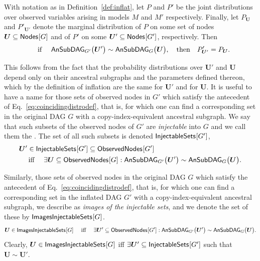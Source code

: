 With notation as in Definition~\ref{def:inflat}, let $P$ and $P'$ be the joint distributions over observed variables arising in models $M$ and $M'$ respectively.  Finally, let $P_{\bm{U}}$ and $P'_{\bm{U}'}$ denote the marginal distribution of $P$ on some set of nodes $\bm{U}\subseteq\nodes{G}$ and of $P'$ on some $\bm{U}'\subseteq\nodes{G'}$, respectively. Then
\begin{align}\label{eq:coincidingdistrodef}
\quad\text{if }\quad \ansubgraph[G']{\bm{U}'}\sim\ansubgraph[G]{\bm{U}}, \quad\text{then}\quad P'_{\bm{U}'}=P_{\bm{U}}.
\end{align}

This follows from the fact that the probability distributions over $\bm{U}'$ and $\bm{U}$ depend only on their ancestral subgraphs and the parameters defined thereon, which by the definition of inflation are the same for $\bm{U}'$ and for $\bm{U}$.
It is useful to have a name for those sets of observed nodes in $G'$ which satisfy the antecedent of Eq.~\eqref{eq:coincidingdistrodef}, that is, for which one can find a corresponding set in the original DAG $G$ with a copy-index-equivalent ancestral subgraph.  We say that such subsets of the observed nodes of $G'$ are {\em injectable} into $G$ and we call them the .  The set of all such subsets is denoted $\SmallNamedFunction{InjectableSets}{G'}$,
\begin{align}\begin{split}\label{eq:definjectable}
&\bm{U}'\in\SmallNamedFunction{InjectableSets}{G'} \subseteq \SmallNamedFunction{ObservedNodes}{G'} \\
&\quad\text{ iff }\quad \exists \bm{U}\subseteq \SmallNamedFunction{ObservedNodes}{G}: \ansubgraph[G']{\bm{U}'}\sim\ansubgraph[G]{\bm{U}}.
\end{split}\end{align}

Similarly,  those sets of observed nodes in the original DAG $G$ which satisfy the antecedent of Eq.~\eqref{eq:coincidingdistrodef}, that is, for which one can find a corresponding set in the inflated DAG $G'$ with a copy-index-equivalent ancestral subgraph, we describe as {\em images of the injectable sets}, and we denote the set of these by $\SmallNamedFunction{ImagesInjectableSets}{G}$.
\begin{align}\begin{split}\label{eq:defimageinjectable}
\bm{U}\in\SmallNamedFunction{ImagesInjectableSets}{G}\quad\text{ iff }\quad \exists \bm{U}' \subseteq \SmallNamedFunction{ObservedNodes}{G'}: \ansubgraph[G']{\bm{U}'}\sim\ansubgraph[G]{\bm{U}}.
\end{split}\end{align}
Clearly, $\bm{U}\in\SmallNamedFunction{ImagesInjectableSets}{G}$ iff $\exists \bm{U}' \subseteq \SmallNamedFunction{InjectableSets}{G'}$ such that $\bm{U}\sim \bm{U}'$.


